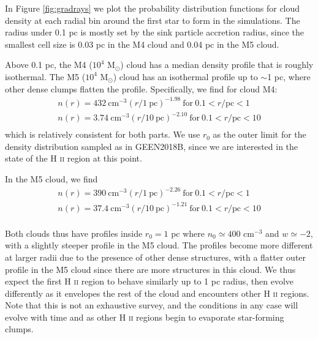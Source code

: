 \documentclass[a4paper,fleqn,usenatbib]{mnras}
\newcommand{\Msolar}{M$_{\odot}$\xspace}
\newcommand{\HII}{H \textsc{ii}\xspace}
\begin{document}
In Figure \ref{fig:gradrays} we plot the probability distribution functions for cloud density at each radial bin around the first star to form in the simulations. The radius under 0.1 pc is mostly set by the sink particle accretion radius, since the smallest cell size is 0.03 pc in the M4 cloud and 0.04 pc in the M5 cloud.

Above 0.1 pc, the M4 ($10^4$ \Msolar) cloud has a median density profile that is roughly isothermal. The M5 ($10^4$ \Msolar) cloud has an isothermal profile up to $\sim$1 pc, where other dense clumps flatten the profile. Specifically, we find for cloud M4:
\begin{equation}
\begin{split}
n(r) = 432~\mathrm{cm}^{-3} (r / 1~\mathrm{pc})^{-1.98}~\mathrm{for}~ 0.1 < r/\mathrm{pc}< 1 \\
n(r) = 3.74~\mathrm{cm}^{-3} (r / 10~\mathrm{pc})^{-2.10}~\mathrm{for}~ 0.1 < r/\mathrm{pc}< 10 \\
\end{split}
\label{ana:nr_M4}
\end{equation}
which is relatively consistent for both parts. We use $r_0$ as the outer limit for the density distribution sampled as in GEEN2018B, since we are interested in the state of the \HII region at this point.

In the M5 cloud, we find 
\begin{equation}
\begin{split}
n(r) = 390~\mathrm{cm}^{-3} (r / 1~\mathrm{pc})^{-2.26}~\mathrm{for}~ 0.1 < r/\mathrm{pc}< 1 \\
n(r) = 37.4~\mathrm{cm}^{-3} (r / 10~\mathrm{pc})^{-1.21}~\mathrm{for}~ 0.1 < r/\mathrm{pc}< 10 \\
\end{split}
\label{ana:nr_M5}
\end{equation}

Both clouds thus have profiles inside $r_0=1$ pc where $n_0\simeq400$ cm$^{-3}$ and $w\simeq-2$, with a slightly steeper profile in the M5 cloud. The profiles become more different at larger radii due to the presence of other dense structures, with a flatter outer profile in the M5 cloud since there are more structures in this cloud. We thus expect the first \HII region to behave similarly up to 1 pc radius, then evolve differently as it envelopes the rest of the cloud and encounters other \HII regions. Note that this is not an exhaustive survey, and the conditions in any case will evolve with time and as other \HII regions begin to evaporate star-forming clumps.
\end{document}
